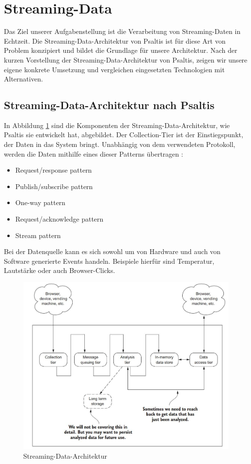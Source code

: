 \section{Streaming-Data}

Das Ziel unserer Aufgabenstellung ist die Verarbeitung von Streaming-Daten in Echtzeit. Die Streaming-Data-Architektur
von Psaltis \cite{psaltis2017streaming} ist für diese Art von Problem konzipiert und bildet die Grundlage für
unsere Architektur. Nach der kurzen Vorstellung der Streaming-Data-Architektur von Psaltis, zeigen wir unsere eigene konkrete
Umsetzung und vergleichen eingesetzten Technologien mit Alternativen.

\subsection{Streaming-Data-Architektur nach Psaltis}

In Abbildung \ref{fig:streaming_data_architecture-psaltis} sind die Komponenten der Streaming-Data-Architektur, wie Psaltis \cite{psaltis2017streaming}
sie entwickelt hat, abgebildet. Der Collection-Tier ist der Einstiegspunkt, der Daten in das System bringt. Unabhängig von dem verwendeten
Protokoll, werden die Daten mithilfe eines dieser Patterns übertragen \cite{psaltis2017streaming}:
\begin{itemize}
    \item Request/response pattern
    \item Publish/subscribe pattern
    \item One-way pattern
    \item Request/acknowledge pattern
    \item Stream pattern
\end{itemize}

Bei der Datenquelle kann es sich sowohl um von Hardware und auch von Software generierte Events handeln. Beispiele hierfür sind
Temperatur, Lautstärke oder auch Browser-Clicks.

\begin{figure}[h]
    \includegraphics[width=.5\textwidth]{images/streaming_data_architecture-psaltis.jpg}
    \caption{Streaming-Data-Architektur \cite{psaltis2017streaming}}
    \label{fig:streaming_data_architecture-psaltis}
\end{figure}

